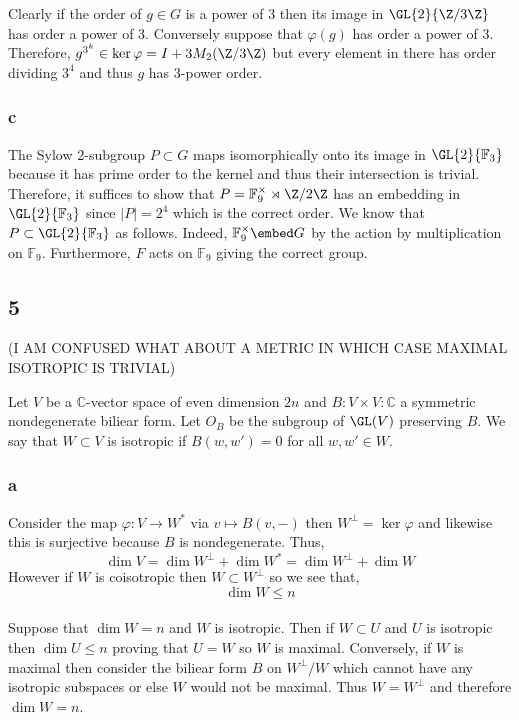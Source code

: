 \documentclass[12pt]{article}
\renewcommand{\C}{\mathbb{C}}
\renewcommand{\F}{\mathbb{F}}
\begin{document}
Clearly if the order of $g \in G$ is a power of $3$ then its image in $\GL{2}{\Z/3\Z}$ has order a power of $3$. Conversely suppose that $\varphi  (g)$ has order a power of $3$. Therefore, $g^{3^k} \in \ker{\varphi} = I + 3 M_2(\Z / 3 \Z)$ but every element in there has order dividing $3^4$ and thus $g$ has $3$-power order.

\subsubsection{c} 

The Sylow $2$-subgroup $P \subset G$ maps isomorphically onto its image in $\GL{2}{\F_3}$ because it has prime order to the kernel and thus their intersection is trivial.
\bigskip\\
Therefore, it suffices to show that $P = \F_9^\times \rtimes \Z / 2 \Z$ has an embedding in $\GL{2}{\F_3}$ since $|P| = 2^4$ which is the correct order. We know that $P \subset \GL{2}{\F_3}$ as follows. Indeed, $\F_9^\times \embed G$ by the action by multiplication on $\F_9$. Furthermore, $F$ acts on $\F_9$ giving the correct group. 


\subsection{5}

(I AM CONFUSED WHAT ABOUT A METRIC IN WHICH CASE MAXIMAL ISOTROPIC IS TRIVIAL)

Let $V$ be a $\C$-vector space of even dimension $2n$ and $B : V \times V : \C$ a symmetric nondegenerate biliear form. Let $O_B$ be the subgroup of $\GL(V)$ preserving $B$. We say that $W \subset V$ is isotropic if $B(w,w') = 0$ for all $w,w' \in W$.

\subsubsection{a}

Consider the map $\varphi : V \to W^*$ via $v \mapsto B(v,-)$ then $W^\perp = \ker{\varphi}$ and likewise this is surjective because $B$ is nondegenerate. Thus,
\[ \dim{V} = \dim{W^\perp} + \dim{W^*} = \dim{W^\perp} + \dim{W} \]
However if $W$ is coisotropic then $W \subset W^\perp$ so we see that, 
\[ \dim{W} \le n \] 
\bigskip\\
Suppose that $\dim{W} = n$ and $W$ is isotropic. Then if $W \subset U$ and $U$ is isotropic then $\dim{U} \le n$ proving that $U = W$ so $W$ is maximal. Conversely, if $W$ is maximal then consider the biliear form $B$ on $W^\perp / W$ which cannot have any isotropic subspaces or else $W$ would not be maximal. Thus $W = W^\perp$ and therefore $\dim{W} = n$.
\end{document}
